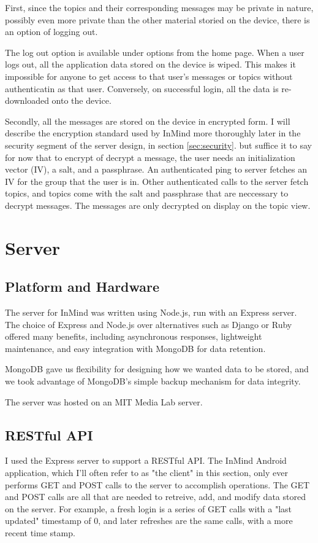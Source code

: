       First, since the topics and their corresponding messages may be private in nature,
      possibly even more private than the other material storied on the device,
      there is an option of logging out.

      The log out option is available under options from the home page.
      When a user logs out, all the application data stored on the device is wiped.
      This makes it impossible for anyone to get access to that user's
      messages or topics without authenticatin as that user.
      Conversely, on successful login, all the data is re-downloaded onto the device.

      Secondly, all the messages are stored on the device in encrypted form.
      I will describe the encryption standard used by InMind more thoroughly
      later in the security segment of the server design, in section \ref{sec:security}.
      but suffice it to say for now that to encrypt of decrypt a message, 
      the user needs an initialization vector (IV),
      a salt, and a passphrase.
      An authenticated ping to server fetches an IV for the group that the user is in.
      Other authenticated calls to the server fetch topics,
      and topics come with the salt and passphrase that are neccessary to decrypt messages.
      The messages are only decrypted on display on the topic view.

  \section{Server}
    \subsection{Platform and Hardware}
      The server for InMind was written using Node.js, run with an Express server.
      The choice of Express and Node.js over alternatives such as Django or Ruby
      offered many benefits, including asynchronous responses,
      lightweight maintenance, and easy integration with MongoDB for data retention.

      MongoDB gave us flexibility for designing how we wanted data to be stored,
      and we took advantage of MongoDB's simple backup mechanism for data integrity.

      The server was hosted on an MIT Media Lab server.

    \subsection{RESTful API}
      I used the Express server to support a RESTful API.
      The InMind Android application,
      which I'll often refer to as "the client" in this section,
      only ever performs GET and POST calls to the server to accomplish operations.
      The GET and POST calls are all that are needed to
      retreive, add, and modify data stored on the server.
      For example, a fresh login is a series of GET calls with a "last updated" timestamp
      of 0, and later refreshes are the same calls, with a more recent time stamp.

